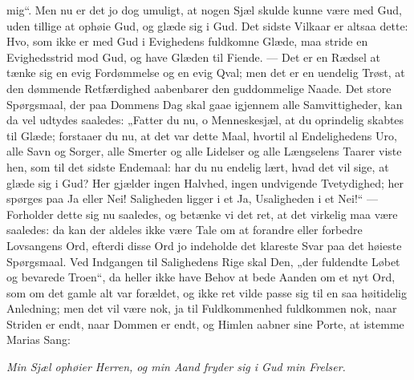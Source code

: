 \documentclass[12pt,a4paper]{book}
\begin{document}
mig“. Men nu er det jo dog umuligt, at nogen Sjæl skulde kunne være med Gud, uden
tillige at ophøie Gud, og glæde sig i Gud. Det sidste Vilkaar er altsaa dette:
Hvo, som ikke er med Gud i Evighedens fuldkomne Glæde, maa stride en
Evighedsstrid mod Gud, og have Glæden til Fiende. --- Det er en Rædsel at tænke
sig en evig Fordømmelse og en evig Qval; men det er en uendelig Trøst, at den
dømmende Retfærdighed aabenbarer den guddommelige Naade. Det store Spørgsmaal,
der paa Dommens Dag skal gaae igjennem alle Samvittigheder, kan da vel udtydes
saaledes: „Fatter du nu, o Menneskesjæl, at du oprindelig skabtes til Glæde;
forstaaer du nu, at det var dette Maal, hvortil al Endelighedens Uro, alle Savn og
Sorger, alle Smerter og alle Lidelser og alle Længselens Taarer viste hen, som til
det sidste Endemaal: har du nu endelig lært, hvad det vil sige, at glæde sig i
Gud? Her gjælder ingen Halvhed, ingen undvigende Tvetydighed; her spørges paa Ja
eller Nei! Saligheden ligger i et Ja, Usaligheden i et Nei!“ --- Forholder dette
sig nu saaledes, og betænke vi det ret, at det virkelig maa være saaledes: da kan
der aldeles ikke være Tale om at forandre eller forbedre Lovsangens Ord, efterdi
disse Ord jo indeholde det klareste Svar paa det høieste Spørgsmaal. Ved
Indgangen til Salighedens Rige skal Den, „der fuldendte Løbet og bevarede Troen“,
da heller ikke have Behov at bede Aanden om et nyt Ord, som om det gamle alt var
forældet, og ikke ret vilde passe sig til en saa høitidelig Anledning; men det vil
være nok, ja til Fuldkommenhed fuldkommen nok, naar
Striden er endt, naar Dommen er endt, og Himlen aabner sine Porte, at istemme
Marias Sang:

\emph{Min Sjæl ophøier Herren, og min Aand fryder sig i Gud min Frelser.}
\end{document}
